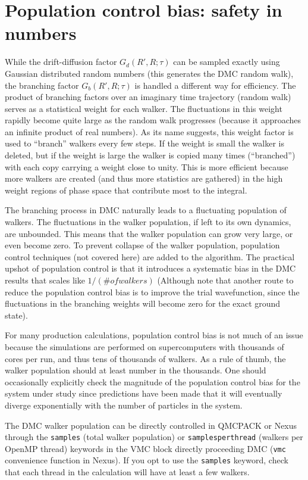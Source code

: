 \documentclass[oneside,11pt]{memoir}
\numberwithin{equation}{section}
\begin{document}
\section{Population control bias: safety in numbers}
While the drift-diffusion factor $G_d(R',R;\tau)$ can be sampled exactly using 
Gaussian distributed random numbers (this generates the DMC random walk), the 
branching factor $G_b(R',R;\tau)$ is handled a different way for efficiency.  
The product of branching factors over an imaginary time trajectory (random 
walk) serves as a statistical weight for each walker.  The fluctuations in 
this weight rapidly become quite large as the random walk progresses 
(because it approaches an infinite product of real numbers).  As its name 
suggests, this weight factor is used to ``branch'' walkers every few steps.  
If the weight is small the walker is deleted, but if the weight is large the 
walker is copied many times (``branched'') with each copy carrying a weight 
close to unity.  This is more efficient because more walkers are created (and 
thus more statistics are gathered) in the high weight regions of phase space 
that contribute most to the integral.

The branching process in DMC naturally leads to a fluctuating population of 
walkers.  The fluctuations in the walker population, if left to its own 
dynamics, are unbounded.  This means that the walker population can grow very 
large, or even become zero.  To prevent collapse of the walker population, 
population control techniques (not covered here) are added to the algorithm.
The practical upshot of population control is that it introduces a systematic 
bias in the DMC results that scales like $1/(\# of walkers)$ (Although note 
that another route to reduce the population control bias is to improve the 
trial wavefunction, since the fluctuations in the branching weights will 
become zero for the exact ground state).  

For many production calculations, population control bias is not much of an 
issue because the simulations are performed on supercomputers with thousands of 
cores per run, and thus tens of thousands of walkers.  As a rule of thumb, the 
walker population should at least number in the thousands.  One should 
occasionally explicitly check the magnitude of the population control bias for 
the system under study since predictions have been made that it will 
eventually diverge exponentially with the number of particles in the system.

The DMC walker population can be directly controlled in QMCPACK or Nexus 
through the \texttt{samples} (total walker population) or 
\texttt{samplesperthread} (walkers per OpenMP thread) keywords in the VMC 
block directly proceeding DMC (\texttt{vmc} convenience function in  
Nexus).  If you opt to use the \texttt{samples} keyword, check that 
each thread in the calculation will have at least a few walkers.
\end{document}

